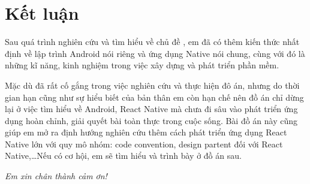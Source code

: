 \newpage
\section*{\centering Kết luận}
Sau quá trình nghiên cứu và tìm hiểu về chủ đề \projects, em đã có thêm kiến thức nhất định về lập trình Android nói riêng và ứng dụng Native nói chung, cùng với đó là những kĩ năng, kinh nghiệm trong việc xây dựng và phát triển phần mềm.

Mặc dù đã rất cố gắng trong việc nghiên cứu và thực hiện đô án, nhưng do thời gian hạn cũng như sự hiểu biết của bản thân em còn hạn chế nên đồ án chỉ dừng lại ở việc tìm hiểu về Android, React Native mà chưa đi sâu vào phát triển ứng dụng hoàn chỉnh, giải quyết bài toàn thực trong cuộc sống. Bài đồ án này cũng giúp em mở ra định hướng nghiên cứu thêm cách phát triển ứng dụng React Native lớn với quy mô nhóm: code convention, design partent đối với React Native,\dots Nếu có cơ hội, em sẽ tìm hiểu và trình bày ở đồ án sau.

\textit{Em xin chân thành cảm ơn!}
\newpage